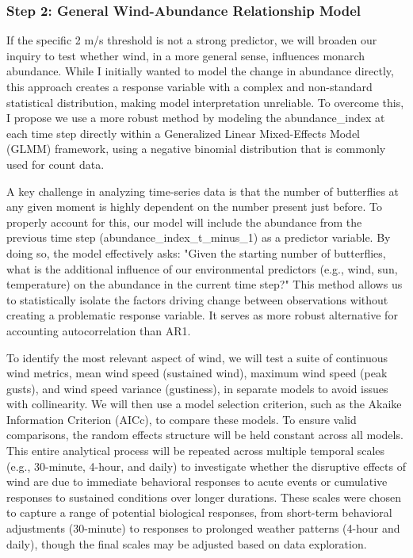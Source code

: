 \subsubsection{Step 2: General Wind-Abundance Relationship Model}

If the specific 2 m/s threshold is not a strong predictor, we will broaden our inquiry to test whether wind, in a more general sense, influences monarch abundance. While I initially wanted to model the change in abundance directly, this approach creates a response variable with a complex and non-standard statistical distribution, making model interpretation unreliable. To overcome this, I propose we use a more robust method by modeling the abundance_index at each time step directly within a Generalized Linear Mixed-Effects Model (GLMM) framework, using a negative binomial distribution that is commonly used for count data.

A key challenge in analyzing time-series data is that the number of butterflies at any given moment is highly dependent on the number present just before. To properly account for this, our model will include the abundance from the previous time step (abundance_index_t_minus_1) as a predictor variable. By doing so, the model effectively asks: "Given the starting number of butterflies, what is the additional influence of our environmental predictors (e.g., wind, sun, temperature) on the abundance in the current time step?" This method allows us to statistically isolate the factors driving change between observations without creating a problematic response variable. It serves as more robust alternative for accounting autocorrelation than AR1.

To identify the most relevant aspect of wind, we will test a suite of continuous wind metrics, mean wind speed (sustained wind), maximum wind speed (peak gusts), and wind speed variance (gustiness), in separate models to avoid issues with collinearity. We will then use a model selection criterion, such as the Akaike Information Criterion (AICc), to compare these models. To ensure valid comparisons, the random effects structure will be held constant across all models. This entire analytical process will be repeated across multiple temporal scales (e.g., 30-minute, 4-hour, and daily) to investigate whether the disruptive effects of wind are due to immediate behavioral responses to acute events or cumulative responses to sustained conditions over longer durations. These scales were chosen to capture a range of potential biological responses, from short-term behavioral adjustments (30-minute) to responses to prolonged weather patterns (4-hour and daily), though the final scales may be adjusted based on data exploration.

